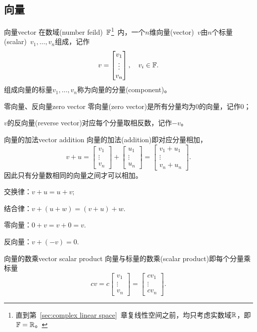 \subsection{向量}
\begin{definition}{向量}{vector}
	在数域(number feild)~$\mathbb F$\footnote{直到第~\ref{sec:complex linear space}~章复线性空间之前，均只考虑实数域$\mathbb R$，即$\mathbb F=\mathbb R$。}~内，一个$n$维向量(vector)~$v$由$n$个标量(scalar)~$v_1,\ldots,v_n$组成，记作
	\[
		v=\begin{bmatrix}
			v_1\\\vdots\\v_n
		\end{bmatrix},\quad v_i\in\mathbb F.
	\]
	组成向量的标量$v_1,\ldots,v_n$称为向量的分量(component)。
\end{definition}
\begin{definition}{零向量、反向量}{zero vector}
	零向量(zero vector)是所有分量均为0的向量，记作0；
	
	$v$的反向量(reverse vector)对应每个分量取相反数，记作$-v$。
\end{definition}
\begin{definition}{向量的加法}{vector addition}
	向量的加法(addition)即对应分量相加，
	\[
		v+u=\begin{bmatrix}
			v_1\\\vdots\\v_n
		\end{bmatrix}+\begin{bmatrix}
			u_1\\\vdots\\u_n
		\end{bmatrix}=\begin{bmatrix}
			v_1+u_1\\\vdots\\v_n+u_n
		\end{bmatrix}.
	\]
	因此只有分量数相同的向量之间才可以相加。
\end{definition}
\begin{compactitem}
	\item 交换律：$v+u=u+v;$
	\item 结合律：$v+(u+w)=(v+u)+w.$
	\item 零向量：$0+v=v+0=v.$
	\item 反向量：$v+(-v)=0.$
\end{compactitem}
\begin{definition}{向量的数乘}{vector scalar product}
	向量与标量的数乘(scalar product)即每个分量乘标量
	\[
		cv=c\begin{bmatrix}
			v_1\\\vdots\\v_n
		\end{bmatrix}=\begin{bmatrix}
			cv_1\\\vdots\\cv_n
		\end{bmatrix}.
	\]
\end{definition}
